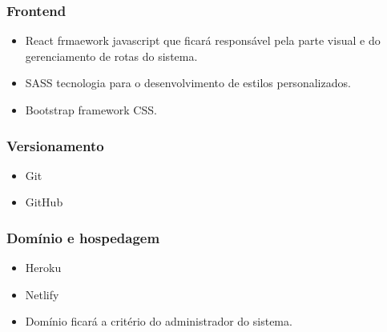\subsubsection{Frontend}
\begin{itemize}
	\item React frmaework javascript que ficará responsável pela parte visual e do gerenciamento de rotas do sistema.
	\item SASS tecnologia para o desenvolvimento de estilos personalizados.
	\item Bootstrap framework CSS.
\end{itemize}
\subsubsection{Versionamento}
\begin{itemize}
	\item Git
	\item GitHub
\end{itemize}
\subsubsection{Domínio e hospedagem}
\begin{itemize}
	\item Heroku
	\item Netlify
	\item Domínio ficará a critério do administrador do sistema.
\end{itemize}

